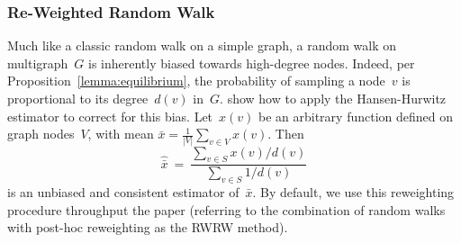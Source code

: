 \documentclass[10pt, conference]{./IEEEtran}
\begin{document}
\subsubsection{Re-Weighted Random Walk}\label{subsec:Re-Weighting the Random Walk}
%
%

Much like a classic random walk on a simple graph,
a random walk on multigraph~$G$ is inherently biased towards high-degree nodes. Indeed, per Proposition~\ref{lemma:equilibrium}, the probability of sampling a node~$v$ is proportional to its degree~$d(v)$ in~$G$.
\cite{Heckathorn97_RDS_introduction,Salganik2004,Newman01_EgoCentered_Networks} show how to apply the Hansen-Hurwitz estimator \cite{HansenHurwitz1943} to correct for this bias.
Let~$x(v)$ be an arbitrary function defined on graph nodes~$V$, with mean
$\bar{x} = \frac{1}{|V|}\sum_{v \in V} x(v).$
%
%
Then
\begin{equation}
	\hat{\bar{x}}\ =\ \frac{\sum_{v \in S} x(v)/d(v)}{\sum_{v \in S} 1/d(v)}
\end{equation}
is an unbiased and consistent estimator of~$\bar{x}$.
By default, we use this reweighting procedure throughput the paper (referring to the combination of random walks with post-hoc reweighting as the RWRW method). 
\end{document}
